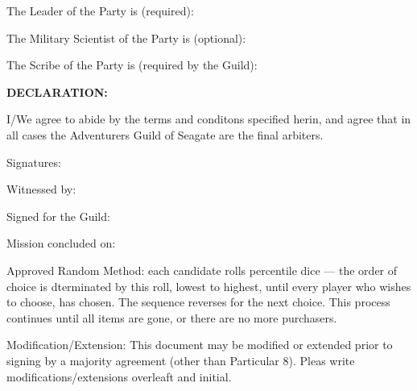 The Leader of the Party is (required):

The Military Scientist of the Party is (optional):

The Scribe of the Party is (required by the Guild):

{\bfseries
DECLARATION:

I/We agree to abide by the terms and conditons specified herin, and
agree that in all cases the Adventurers Guild of Seagate are the final
arbiters.}

Signatures:

\vspace{14em}

Witnessed by:

\vspace{4em}

Signed for the Guild:

\vspace{4em}

Mission concluded on:

{\tiny Approved Random Method: each candidate rolls percentile dice
--- the order of choice is dterminated by this roll, lowest to
highest, until every player who wishes to choose, has chosen.
The sequence reverses for the next choice.  This process continues
until all items are gone, or there are no more purchasers.

Modification/Extension: This document may be modified or extended
prior to signing by a majority agreement (other than Particular 8).
Pleas write modifications/extensions overleaft and initial.}
